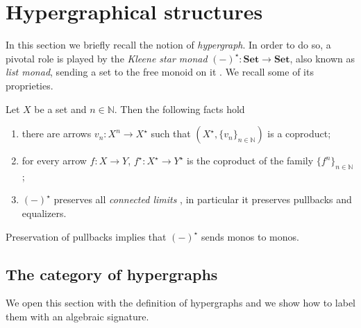 \documentclass[a4paper,UKenglish,cleveref,pdftex,thm-restate,numberwithinsect]{lipics-v2021}
\newcommand{\lgh}{\mathsf{lg}}
\newcommand{\Set}{\mathbf{Set}}
\def\X{\textbf {\textup{X}}}
\begin{document}
\section{Hypergraphical structures}\label{sec:hyper}

In this section we briefly recall the notion of \emph{hypergraph}. In order to do so, a pivotal role is played by the \emph{Kleene star monad} $(-)^\star\colon \Set\to \Set$, also known as 
\emph{list monad},
sending a set to the free monoid on it \cite{sakarovitch2009elements,Wadler95}.
We recall some of its proprieties.

\begin{proposition}\label{prop:fact}
	Let $X$ be a set and $n\in \mathbb{N}$. Then the following facts hold
	\begin{enumerate}
		\item there are arrows $v_{n}\colon X^n\to X^\star $ such that $(X^\star, \{v_{n}\}_{n\in \mathbb{N}})$ is a coproduct;
		\item for every arrow $f\colon X\to Y$, $f^\star\colon X^\star \to Y^\star$ is the coproduct of the family $\{f^n\}_{n\in \mathbb{N}}$;
		\item $(-)^\star$ preserves all \emph{connected limits} \cite{carboni1995connected}, in particular it preserves pullbacks and equalizers.
	\end{enumerate}
\end{proposition}

\begin{remark}\label{rem:mono}
	Preservation of pullbacks implies that $(-)^\star$ sends monos to monos.
\end{remark}


\subsection{The category of hypergraphs}

We open this section with the definition of hypergraphs and we show how to label them with an algebraic signature.  
\end{document}
